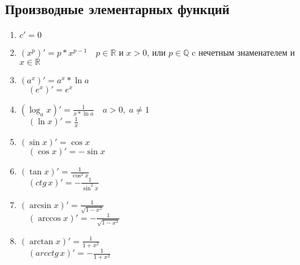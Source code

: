 \subsection{Производные элементарных функций \href{https://youtu.be/OXDjegAsmSU?t=3881}{\Walley}}
\begin{enumerate}
    \item $c' = 0$
    \item $(x^p)' = p * x^{p - 1} \quad p \in \mathbb{R}$ и $x > 0$, или $p \in \mathbb{Q}$ c нечетным знаменателем и $x \in \mathbb{R}$
    \item $(a^x)' = a^x * \ln a$ \\
    $\quad (e^x)' = e^x$
    \item $(\log_a x)' = \frac{1}{x * \ln a} \quad a > 0, \; a \neq 1$ \\
    $\quad (\ln x)' = \frac{1}{x}$
    \item $(\sin x)' = \cos x$ \\
    $\quad (\cos x)' = -\sin x$
    \item $(\tan x)' = \frac{1}{\cos^2 x}$ \\
    $\quad (ctg \, x)' = -\frac{1}{\sin^2 x} $
    \item $(\arcsin x)' = \frac{1}{\sqrt{1 - x^2}}$ \\
    $\quad (\arccos x)' = -\frac{1}{\sqrt{1 - x^2}}$ 
    \item $(\arctan x)' = \frac{1}{1 + x^2}$ \\
    $\quad (arcctg \, x)' = - \frac{1}{1 + x^2}$
\end{enumerate}
